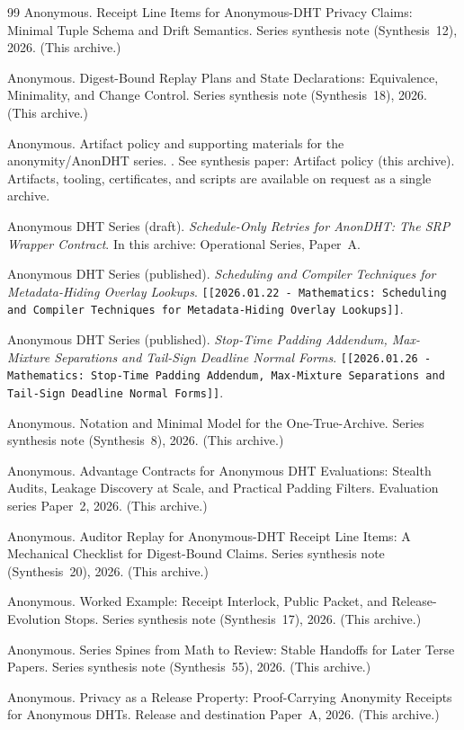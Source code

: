 \documentclass[11pt]{article}
\begin{document}
\begin{thebibliography}{99}
Anonymous.
\newblock Receipt Line Items for Anonymous-DHT Privacy Claims: Minimal Tuple Schema and Drift Semantics.
\newblock Series synthesis note (Synthesis~12), 2026. (This archive.)

Anonymous.
\newblock Digest-Bound Replay Plans and State Declarations: Equivalence, Minimality, and Change Control.
\newblock Series synthesis note (Synthesis~18), 2026. (This archive.)

Anonymous.
\newblock Artifact policy and supporting materials for the anonymity/AnonDHT series.
.
\newblock See synthesis paper: Artifact policy (this archive). Artifacts, tooling, certificates, and scripts are available on request as a single archive.



Anonymous DHT Series (draft).
\emph{Schedule-Only Retries for AnonDHT: The SRP Wrapper Contract}.
In this archive: Operational Series, Paper~A.

Anonymous DHT Series (published).
\emph{Scheduling and Compiler Techniques for Metadata-Hiding Overlay Lookups}.
\texttt{[[2026.01.22 - Mathematics: Scheduling and Compiler Techniques for Metadata-Hiding Overlay Lookups]]}.

Anonymous DHT Series (published).
\emph{Stop-Time Padding Addendum, Max-Mixture Separations and Tail-Sign Deadline Normal Forms}.
\texttt{[[2026.01.26 - Mathematics: Stop-Time Padding Addendum, Max-Mixture Separations and Tail-Sign Deadline Normal Forms]]}.


Anonymous.
\newblock Notation and Minimal Model for the One-True-Archive.
\newblock Series synthesis note (Synthesis~8), 2026. (This archive.)


Anonymous.
\newblock Advantage Contracts for Anonymous DHT Evaluations: Stealth Audits, Leakage Discovery at Scale, and Practical Padding Filters.
\newblock Evaluation series Paper~2, 2026. (This archive.)

Anonymous.
\newblock Auditor Replay for Anonymous-DHT Receipt Line Items: A Mechanical Checklist for Digest-Bound Claims.
\newblock Series synthesis note (Synthesis~20), 2026. (This archive.)

Anonymous.
\newblock Worked Example: Receipt Interlock, Public Packet, and Release-Evolution Stops.
\newblock Series synthesis note (Synthesis~17), 2026. (This archive.)

Anonymous.
\newblock Series Spines from Math to Review: Stable Handoffs for Later Terse Papers.
\newblock Series synthesis note (Synthesis~55), 2026. (This archive.)

Anonymous.
\newblock Privacy as a Release Property: Proof-Carrying Anonymity Receipts for Anonymous DHTs.
\newblock Release and destination Paper~A, 2026. (This archive.)

\end{thebibliography}
\end{document}
